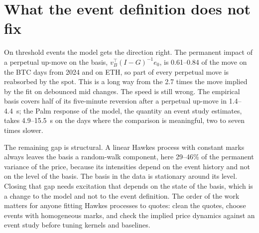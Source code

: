 \documentclass[a4paper,11pt]{article}
\begin{document}
\section{What the event definition does not fix}

\enlargethispage{3\baselineskip}

On threshold events the model gets the direction right. The permanent impact of a perpetual up-move on the basis, $v_B^\top (I - G)^{-1} e_0$, is 0.61--0.84 of the move on the BTC days from 2024 and on ETH, so part of every perpetual move is reabsorbed by the spot. This is a long way from the 2.7 times the move implied by the fit on debounced mid changes. The speed is still wrong. The empirical basis covers half of its five-minute reversion after a perpetual up-move in 1.4--4.4~s; the Palm response of the model, the quantity an event study estimates, takes 4.9--15.5~s on the days where the comparison is meaningful, two to seven times slower.

The remaining gap is structural. A linear Hawkes process with constant marks always leaves the basis a random-walk component, here 29--46\% of the permanent variance of the price, because its intensities depend on the event history and not on the level of the basis. The basis in the data is stationary around its level. Closing that gap needs excitation that depends on the state of the basis, which is a change to the model and not to the event definition. The order of the work matters for anyone fitting Hawkes processes to quotes: clean the quotes, choose events with homogeneous marks, and check the implied price dynamics against an event study before tuning kernels and baselines.
\end{document}
